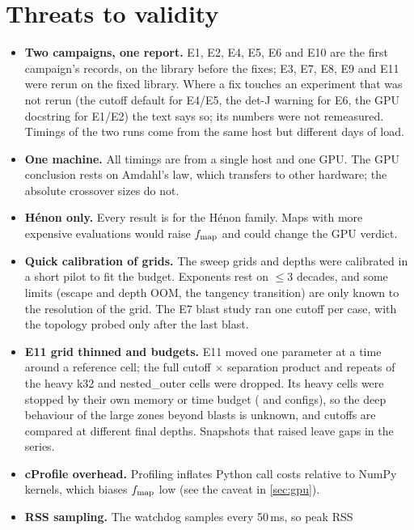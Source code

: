\documentclass[11pt,a4paper]{article}
\begin{document}
\section{Threats to validity}
\label{sec:threats}

\begin{itemize}[leftmargin=*]
\item \textbf{Two campaigns, one report.} E1, E2, E4, E5, E6 and E10 are the
  first campaign's records, on the library before the fixes; E3, E7, E8, E9
  and E11 were rerun on the fixed library. Where a fix touches an experiment
  that was not rerun (the cutoff default for E4/E5, the det-J warning for E6,
  the GPU docstring for E1/E2) the text says so; its numbers were not
  remeasured. Timings of the two runs come from the same host but different
  days of load.
\item \textbf{One machine.} All timings are from a single host and one GPU.
  The GPU conclusion rests on Amdahl's law, which transfers to other
  hardware; the absolute crossover sizes do not.
\item \textbf{Hénon only.} Every result is for the Hénon family. Maps with
  more expensive evaluations would raise $f_{\rm map}$ and could change the
  GPU verdict.
\item \textbf{Quick calibration of grids.} The sweep grids and depths were
  calibrated in a short pilot to fit the budget. Exponents rest on
  $\le$3 decades, and some limits (escape and depth OOM, the tangency
  transition) are only known to the resolution of the grid. The E7 blast
  study ran one cutoff per case, with the topology probed only after the
  last blast.
\item \textbf{E11 grid thinned and budgets.} E11 moved one parameter at a
  time around a reference cell; the full cutoff $\times$ separation product
  and repeats of the heavy k32 and nested\_outer cells were dropped. Its
  heavy cells were stopped by their own memory or time budget
  (\NumDeepStopMemoryBudget{} and \NumDeepStopBudget{} configs), so the deep
  behaviour of the large zones beyond \NumDeepBlastsKTwoEight{} blasts is unknown, and
  cutoffs are compared at different final depths. Snapshots that raised
  leave gaps in the series.
\item \textbf{cProfile overhead.} Profiling inflates Python call costs
  relative to NumPy kernels, which biases $f_{\rm map}$ low (see the caveat
  in \cref{sec:gpu}).
\item \textbf{RSS sampling.} The watchdog samples every 50\,ms, so peak RSS

\end{itemize}
\end{document}

